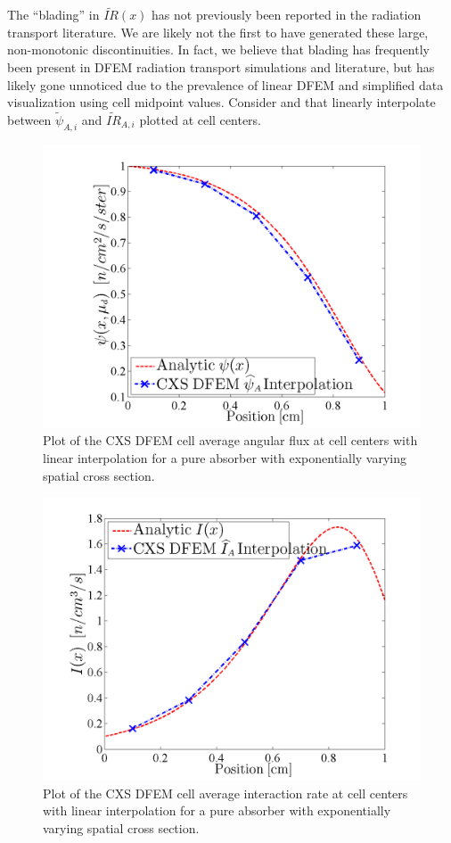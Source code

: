 The ``blading'' in $\widetilde{IR}(x)$ has not previously been reported in the radiation transport literature.
We are likely not the first to have generated these large, non-monotonic discontinuities. 
In fact, we believe that blading has frequently been present in DFEM radiation transport simulations and literature, but has likely gone unnoticed due to the prevalence of linear DFEM and simplified data visualization using cell midpoint values.
Consider  and  that linearly interpolate between $\widetilde{\psi}_{A,i}$ and  $\widetilde{IR}_{A,i}$ plotted at cell centers.
\begin{figure}[!htp]
\centering
\includegraphics[width=12cm]{chapter3_variable_xs/CXS_Psi_A_Profile.png}
\caption{Plot of the CXS DFEM cell average angular flux at cell centers with linear interpolation for a pure absorber with exponentially varying spatial cross section.}
\label{fig:cxs_avg_psi}
\end{figure}
%
%
\begin{figure}[!htp]
\centering
\includegraphics[width=12cm]{chapter3_variable_xs/CXS_I_A_Profile.png}
\caption{Plot of the CXS DFEM cell average interaction rate at cell centers with linear interpolation for a pure absorber with exponentially varying spatial cross section.}
\label{fig:cxs_avg_ir}
\end{figure}
